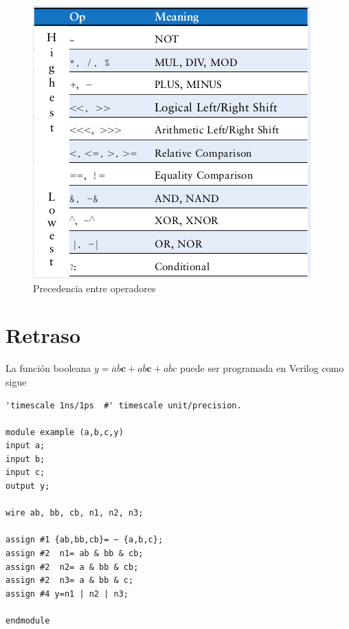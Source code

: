 \documentclass[12pt,letterpaper]{book}
\begin{document}
\begin{figure}[H] 
\centering
\includegraphics[width=1\linewidth]{figures/a1.png}
\caption{Precedencia entre operadores\cite[Pág . ?]{Harris}}
\label{a1}
\end{figure}
\vspace{0.2cm}

\section{Retraso}

La función booleana $y=\overline{a}\overline{b}\textbf{c}+a\overline{b}\textbf{c}+a\overline{b}c$ puede ser programada en Verilog como sigue \cite[Pág. 183]{Harris}

\begin{lstlisting}[frame=single]
'timescale 1ns/1ps  #' timescale unit/precision.  

module example (a,b,c,y)
input a;
input b;
input c;
output y;

wire ab, bb, cb, n1, n2, n3;

assign #1 {ab,bb,cb}= ~ {a,b,c};
assign #2  n1= ab & bb & cb;
assign #2  n2= a & bb & cb;
assign #2  n3= a & bb & c;
assign #4 y=n1 | n2 | n3;

endmodule

\end{lstlisting}
\end{document}

